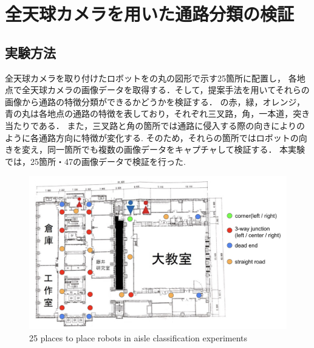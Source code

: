 \documentclass[../main]{subfiles}
\begin{document}
    \clearpage

    \section{全天球カメラを用いた通路分類の検証}
        \subsection{実験方法}
        全天球カメラを取り付けたロボットをの丸の図形で示す25箇所に配置し，
        各地点で全天球カメラの画像データを取得する．そして，提案手法を用いてそれらの画像から通路の特徴分類ができるかどうかを検証する．
        の赤，緑，オレンジ，青の丸は各地点の通路の特徴を表しており，それぞれ三叉路，角，一本道，突き当たりである．
        また，三叉路と角の箇所では通路に侵入する際の向きによりのように各通路方向に特徴が変化する.
        そのため，それらの箇所ではロボットの向きを変え，同一箇所でも複数の画像データをキャプチャして検証する．
        本実験では，25箇所・47の画像データで検証を行った.

        \begin{figure}[H]
         \centering
         \includegraphics[width=14cm]{../images/experiment_point.png}
         \caption{25 places to place robots in aisle classification experiments}
         \label{figure::experiment_point}
        \end{figure}
\end{document}
